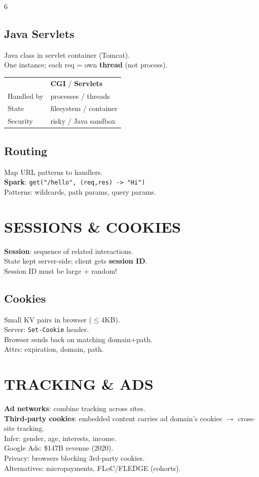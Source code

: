 \documentclass[10pt,landscape,letterpaper]{article}
\newcommand{\concept}[1]{\textcolor{conceptcyan}{\textbf{#1}}}
\newcommand{\important}[1]{\colorbox{highlightyellow}{#1}}
\begin{document}
\begin{multicols}{6}
\subsection{Java Servlets}
Java class in servlet container (Tomcat).\\
One instance; each req = own \textbf{thread} (not process).\\
\begin{tabular}{@{}ll@{}}
 & \concept{CGI} / \concept{Servlets} \\
Handled by & processes / threads \\
State & filesystem / container \\
Security & risky / Java sandbox
\end{tabular}

\subsection{Routing}
Map URL patterns to handlers.\\
\concept{Spark}: \texttt{get("/hello", (req,res) -> "Hi")}\\
Patterns: wildcards, path params, query params.

\section{SESSIONS \& COOKIES}
\concept{Session}: sequence of related interactions.\\
State kept server-side; client gets \concept{session ID}.\\
\important{Session ID must be large + random!}

\subsection{Cookies}
Small KV pairs in browser ($\leq$4KB).\\
Server: \texttt{Set-Cookie} header.\\
Browser sends back on matching domain+path.\\
Attrs: expiration, domain, path.

\section{TRACKING \& ADS}
\concept{Ad networks}: combine tracking across sites.\\
\concept{Third-party cookies}: embedded content carries ad domain's cookies $\to$ cross-site tracking.\\
Infer: gender, age, interests, income.\\
\important{Google Ads: \$147B revenue (2020).}\\
Privacy: browsers blocking 3rd-party cookies.\\
Alternatives: micropayments, FLoC/FLEDGE (cohorts).

\end{multicols}
\end{document}
